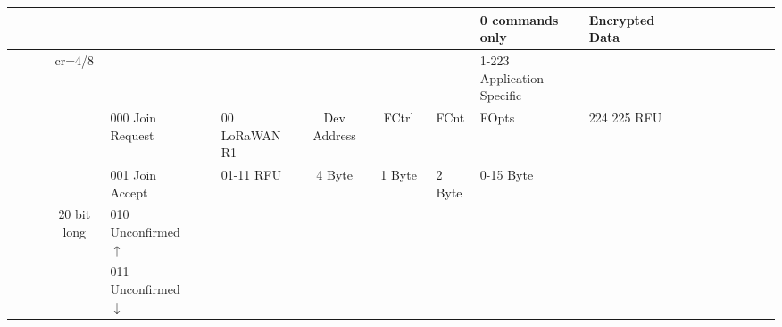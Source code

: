 \begin{table}[h!]
\begin{tabular}{l|l|l|l|l|l|l|l|l|l|l|l|l|l|l|l|l|l|l|l|l|l|l|l|l|l}
						&														&								&																		&																						&															&															&															&																											&														&																							&																		&																			&																																	&																																		&																	&	0	commands only															&	Encrypted  Data																&																&							&																\\\hline
						&														&								&	\multicolumn{2}{c}{cr=4/8}																										&															&															&															&																											&														&																							&																		&																			&																																	&																																		&																	&	1-223	Application Specific									&																								&																&							&																\\\hline
						&														&								&															 			&																						&	000	Join Request						&															&	00			LoRaWAN R1					&	\multicolumn{2}{c}{Dev Address}											&	\multicolumn{5}{c}{FCtrl }																																																																																													&	FCnt 																															&	FOpts 													&	224 225	RFU																	&																								&																&							&																\\\hline
						&														&								&															 			&																						&	001	Join Accept							&															&	01-11		RFU									&	\multicolumn{2}{c}{4 Byte}													&	\multicolumn{5}{c}{1 Byte}																																																																																													&	2 Byte																														&	0-15 Byte												&																							&																								&																&							&																\\\hline
						&														&								&	\multicolumn{2}{c}{20 bit long}																								&	010	Unconfirmed $\uparrow$	&															&															& 											&															&														&																							&																		&																			&																																	&																																		&																	&																							&																								&																&							&																\\\hline
						&														&								&																		&																						&	011	Unconfirmed $\downarrow$&															&															&												&															&														&																							&																		&																			&																																	&																																		&																	&																							&																								&																&							&																\\\hline

\end{tabular}
\end{table}
